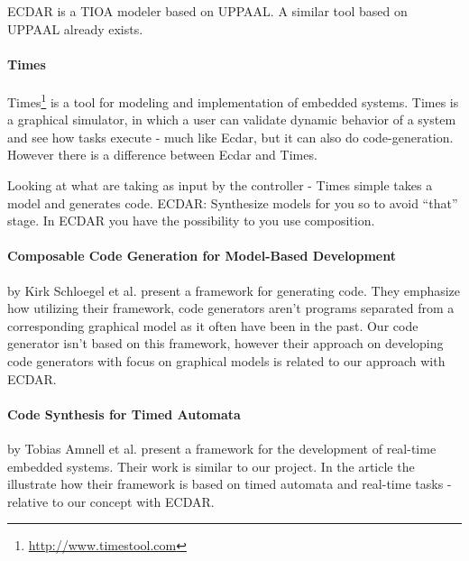 ECDAR is a TIOA modeler based on UPPAAL. A similar tool based on UPPAAL already
exists.

\paragraph{Times}
Times\footnote{\url{http://www.timestool.com}} is a tool for modeling and
implementation of embedded systems. Times is a graphical simulator, in which a
user can validate dynamic behavior of a system and see how tasks execute - much
like Ecdar, but it can also do code-generation. However there is a difference
between Ecdar and Times.

Looking at what are taking as input by the controller - Times simple takes a
model and generates code. ECDAR: Synthesize models for you so to avoid “that”
stage. In ECDAR you have the possibility to you use composition.

\paragraph{Composable Code Generation for Model-Based Development}
by Kirk Schloegel et al. present a framework for generating
code\cite{composable-code-generation}. They emphasize how utilizing their
framework, code generators aren't programs separated from a corresponding
graphical model as it often have been in the past. Our code generator isn't
based on this framework, however their approach on developing code generators
with focus on graphical models is related to our approach with ECDAR.

\paragraph{Code Synthesis for Timed Automata}
by Tobias Amnell et al. present a framework for the development of real-time
embedded systems\cite{Amnell:2002:CST:779110.779112}. Their work is similar to
our project. In the article the illustrate how their framework is based on timed
automata and real-time tasks - relative to our concept with ECDAR.
